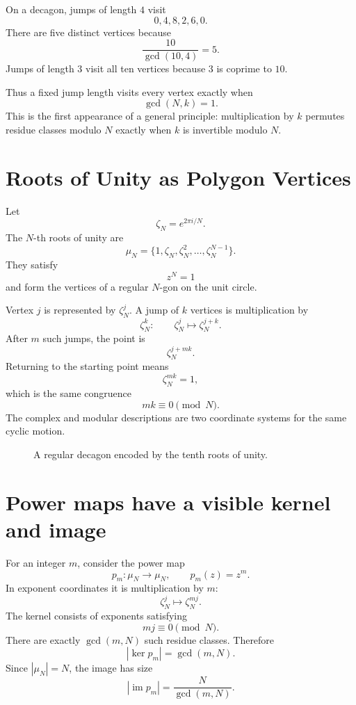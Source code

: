 On a decagon, jumps of length \(4\) visit
\[
  0,4,8,2,6,0.
\]
There are five distinct vertices because
\[
  \frac{10}{\gcd(10,4)}=5.
\]
Jumps of length \(3\) visit all ten vertices because \(3\) is coprime to \(10\).

Thus a fixed jump length visits every vertex exactly when
\[
  \gcd(N,k)=1.
\]
This is the first appearance of a general principle: multiplication by \(k\) permutes residue classes modulo \(N\) exactly when \(k\) is invertible modulo \(N\).

\section{Roots of Unity as Polygon Vertices}

Let
\[
  \zeta_N=e^{2\pi i/N}.
\]
The \(N\)-th roots of unity are
\[
  \mu_N
  =\{1,\zeta_N,\zeta_N^2,\ldots,\zeta_N^{N-1}\}.
\]
They satisfy
\[
  z^N=1
\]
and form the vertices of a regular \(N\)-gon on the unit circle.

Vertex \(j\) is represented by \(\zeta_N^j\).  A jump of \(k\) vertices is multiplication by
\[
  \zeta_N^k:
  \qquad
  \zeta_N^j\longmapsto\zeta_N^{j+k}.
\]
After \(m\) such jumps, the point is
\[
  \zeta_N^{j+mk}.
\]
Returning to the starting point means
\[
  \zeta_N^{mk}=1,
\]
which is the same congruence
\[
  mk\equiv0\pmod N.
\]
The complex and modular descriptions are two coordinate systems for the same cyclic motion.

\begin{figure}[H]
\centering
{}
\caption{A regular decagon encoded by the tenth roots of unity.}
\end{figure}

\section{Power maps have a visible kernel and image}

For an integer \(m\), consider the power map
\[
  p_m:\mu_N\to\mu_N,
  \qquad
  p_m(z)=z^m.
\]
In exponent coordinates it is multiplication by \(m\):
\[
  \zeta_N^j\longmapsto\zeta_N^{mj}.
\]
The kernel consists of exponents satisfying
\[
  mj\equiv0\pmod N.
\]
There are exactly \(\gcd(m,N)\) such residue classes.  Therefore
\[
  |\ker p_m|=\gcd(m,N).
\]
Since \(|\mu_N|=N\), the image has size
\[
  |\operatorname{im}p_m|
  =\frac{N}{\gcd(m,N)}.
\]

